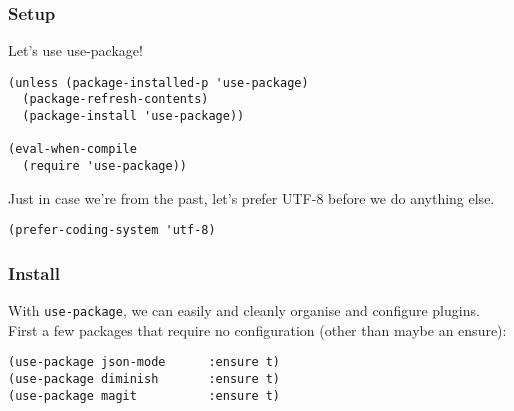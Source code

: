 \documentclass[11pt]{article}
\begin{document}
\subsubsection{Setup}
\label{sec-1-2-1}

Let's use use-package!

\begin{verbatim}
(unless (package-installed-p 'use-package)
  (package-refresh-contents)
  (package-install 'use-package))

(eval-when-compile
  (require 'use-package))
\end{verbatim}

Just in case we're from the past, let's prefer UTF-8 before we do anything else.

\begin{verbatim}
(prefer-coding-system 'utf-8)
\end{verbatim}

\subsubsection{Install}
\label{sec-1-2-2}

With \texttt{use-package}, we can easily and cleanly organise and configure plugins. First a few packages
that require no configuration (other than maybe an ensure):

\begin{verbatim}
(use-package json-mode      :ensure t)
(use-package diminish       :ensure t)
(use-package magit          :ensure t)
\end{verbatim}
\end{document}
